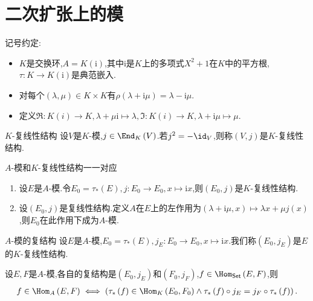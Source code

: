 \section{二次扩张上的模}

记号约定:
\begin{itemize}
	\item $K$是交换环,$A=K(\mathrm{i})$,其中$\mathrm{i}$是$K$上的多项式$X^{2}+1$在$K$中的平方根,$\tau:K\to K(\mathrm{i})$是典范嵌入.
	\item 对每个$\left(\lambda,\mu\right)\in K\times K$有$\rho\left(\lambda+\mathrm{i}\mu\right)=\lambda-\mathrm{i}\mu$.
	\item 定义$\Re:K(i)\to K,\lambda+\mu\mathrm{i}\mapsto\lambda,\Im:K(i)\to K,\lambda+\mathrm{i}\mu\mapsto\mu$.
\end{itemize}

\begin{definition}{$K$-复线性结构}{}
	设$V$是$K$-模,$j\in\End_{K}\left(V\right)$.若$j^{2}=-\id_{V}$,则称$\left(V,j\right)$是$K$-复线性结构.
\end{definition}

\begin{proposition}{$A$-模和$K$-复线性结构一一对应}{}
	\begin{enumerate}
		\item 设$E$是$A$-模.令$E_{0}=\tau_{\ast}\left(E\right),j:E_{0}\to E_{0},x\mapsto\mathrm{i}x$,则$\left(E_{0},j\right)$是$K$-复线性结构.
		\item 设$\left(E_{0},j\right)$是复线性结构.定义$A$在$E$上的左作用为$\left(\lambda+\mathrm{i}\mu,x\right)\mapsto\lambda x+\mu j\left(x\right)$,则$E_{0}$在此作用下成为$A$-模.
	\end{enumerate}
\end{proposition}

\begin{definition}{$A$-模的复结构}{}
	设$E$是$A$-模,$E_{0}=\tau_{\ast}\left(E\right),j_{E}:E_{0}\to E_{0},x\mapsto\mathrm{i}x$.我们称$\left(E_{0},j_{E}\right)$是$E$的$K$-复线性结构.
\end{definition}

\begin{proposition}{}{}
	设$E,F$是$A$-模,各自的复结构是$\left(E_{0},j_{E}\right)$和$\left(F_{0},j_{F}\right)$,$f\in\Hom_{\mathsf{Set}}\left(E,F\right)$,则
	\begin{align*}
		f\in\Hom_{A}\left(E,F\right)\iff\left(\tau_{\ast}\left(f\right)\in\Hom_{K}\left(E_{0},F_{0}\right)\wedge\tau_{\ast}\left(f\right)\circ j_{E}=j_{F}\circ\tau_{\ast}\left(f\right)\right).
	\end{align*}
\end{proposition}

